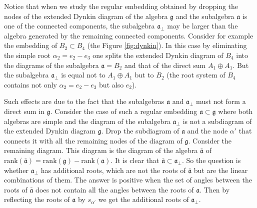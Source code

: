 \documentclass[a4paper,12pt]{article}
\theoremstyle{definition} \newtheorem{Def}{Definition}
\begin{document}
Notice that when we study the regular embedding obtained by dropping the nodes
of the extended Dynkin diagram of the algebra $\mathfrak{g}$ and the
subalgebra $\mathfrak{a}$ is one of the connected components,
the subalgebra $\mathfrak{a}_{\bot}$ may be larger than the algebra
generated by the remaining connected components.
Consider for example the embedding of $B_2\subset B_4$ (the Figure \ref{fig:dynkin}).
In this case by eliminating
the simple root $\alpha_2=e_2-e_3$ one splits the extended Dynkin diagram of $B_4$
into the diagrams of the subalgebra $\mathfrak{a}=B_2$ and that of the direct
sum $A_1 \oplus A_1 $. But the subalgebra $\mathfrak{a}_{\bot}$ is equal not to
$A_1\oplus A_1$ but to $B_2$ (the root system of $B_4$ contains not only $\alpha_2=e_2-e_3$ but also $e_2$).

Such effects are due to the fact that the subalgebras $\mathfrak{a}$ and $\mathfrak{a}_{\bot}$ must not form a direct sum in $\mathfrak{g}$.  
Consider the case of such a regular embedding $\mathfrak{a}\subset \mathfrak{g}$ where both algebras are simple and the diagram of the subalgebra $\mathfrak{a}_{\bot}$ is not a subdiagram of the extended Dynkin diagram $\mathfrak{g}$.
 Drop the subdiagram of $\mathfrak{a}$ and the node $\alpha'$ that connects it with all the remaining nodes of the diagram of $\mathfrak{g}$. Consider the remaining diagram. This diagram is the diagram of the algebra $\mathfrak{\bar{a}}$ of $\mathrm{rank}(\mathfrak{\bar{a}}) = \mathrm{rank}(\mathfrak{g})-\mathrm{rank}(\mathfrak{a})$. It is clear that $\mathfrak{\bar{a}}\subset \mathfrak{a}_{\bot}$. So the question is whether $\mathfrak{a}_{\bot}$ has additional roots, which are not the roots of $\mathfrak{\bar{a}}$ but are the linear combinations of them. The answer is positive  when the set of angles between the roots of $\mathfrak{\bar{a}}$ does not contain all the angles between the roots of $\mathfrak{a}$. Then by reflecting the roots of $\mathfrak{a}$ by $s_{\alpha'}$ we get the additional roots of $\mathfrak{a}_{\bot}$.
\end{document}
